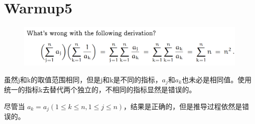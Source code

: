 \documentclass[]{article}
\begin{document}
\section*{Warmup5}
\begin{figure}[htb]
	\includegraphics[scale=1]{W5}
\end{figure}
虽然j和k的取值范围相同，但是j和k是不同的指标，$a_{j}$和$a_{k}$也未必是相同值。使用统一的指标k去替代两个独立的，不相同的指标显然是错误的。\par 
尽管当 $a_{k} = a_{j} (1 \le k \le n,1 \le j \le n)$，结果是正确的，但是推导过程依然是错误的。\par 
\end{document}
